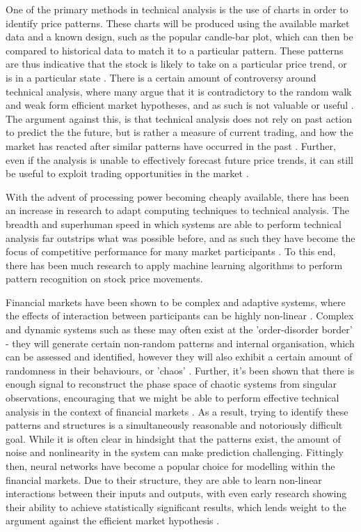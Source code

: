 \documentclass[a4paper,11pt,oneside]{article}
\theoremstyle{plain}
\theoremstyle{definition}
\begin{document}
	One of the primary methods in technical analysis is the use of charts in order to identify price patterns. 
	These charts will be produced using the available market data and a known design, such as the popular candle-bar 
	plot, which can then be compared to historical data to match it to a particular pattern. These patterns are thus 
	indicative that the stock is likely to take on a particular price trend, or is in a particular state \cite {Murphy}.  
	There is a certain amount of controversy around technical analysis, where many argue that it is contradictory 
	to the random walk and weak form efficient market hypotheses, and as such is not valuable or useful \cite {Griffioen}. 
	The argument against this, is that technical analysis does not rely on past action to predict the the future, but is 
	rather a measure of current trading, and how the market has reacted after similar patterns have occurred in the 
	past \cite {Kahn}. Further, even if the analysis is unable to effectively forecast future price trends, it can still be useful 
	to exploit trading opportunities in the market \cite{Schwager}.
	\hfill \break 
	
	With the advent of processing power becoming cheaply available, there has been an increase in research to 
	adapt computing techniques to technical analysis. The breadth and superhuman speed in which systems are 
	able to perform technical analysis far outstrips what was possible before, and as such they have become the 
	focus of competitive performance for many market participants \cite {Johnson}. To this end, there has been much 
	research to apply machine learning algorithms to perform pattern recognition on stock price movements.
	\hfill \break
	
	Financial markets have been shown to be complex and adaptive systems, where the effects of interaction 
	between participants can be highly non-linear \cite {Arthur}. Complex and dynamic systems such as these may 
	often exist at the 'order-disorder border' - they will generate certain non-random patterns and internal organisation, 
	which can be assessed and identified, however they will also exhibit a certain amount of randomness in their behaviours, 
	or 'chaos' \cite {Crutchfield}. Further, it's been shown that there is enough signal to reconstruct 
	the phase space of chaotic systems from singular observations, encouraging that we might be able to perform 
	effective technical analysis in the context of financial markets \cite{Packard, Takens}. As a result, trying to identify these patterns and structures is a simultaneously 
	reasonable and notoriously difficult goal. While it is often clear in hindsight that the patterns exist, the amount of 
	noise and nonlinearity in the system can make prediction challenging.
	Fittingly then, neural networks have become a popular choice for modelling within the financial markets. Due to 
	their structure, they are able to learn non-linear interactions between their inputs and outputs, with even early research 
	showing their ability to achieve statistically significant results, which lends weight to the 
	argument against the efficient market hypothesis \cite {Skabar}. 
	\hfill \break
	
\end{document}
